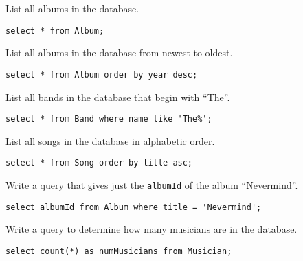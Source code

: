 \documentclass[12pt]{exam}
\begin{document}
\begin{questions}

\question List all albums in the database.
\begin{solution}

\begin{verbatim}
select * from Album;
\end{verbatim}
\end{solution}

\question List all albums in the database from newest to oldest.
\begin{solution}

\begin{verbatim}
select * from Album order by year desc;
\end{verbatim}
\end{solution}

\question List all bands in the database that begin with ``The''.
\begin{solution}

\begin{verbatim}
select * from Band where name like 'The%';
\end{verbatim}
\end{solution}

\question List all songs in the database in alphabetic order.
\begin{solution}

\begin{verbatim}
select * from Song order by title asc;
\end{verbatim}
\end{solution}

\question Write a query that gives just the \texttt{albumId} of the
album ``Nevermind''.
\begin{solution}

\begin{verbatim}
select albumId from Album where title = 'Nevermind';
\end{verbatim}
\end{solution}


\question Write a query to determine how many musicians are in the database.
\begin{solution}

\begin{verbatim}
select count(*) as numMusicians from Musician;
\end{verbatim}
\end{solution}


\end{questions}
\end{document}
